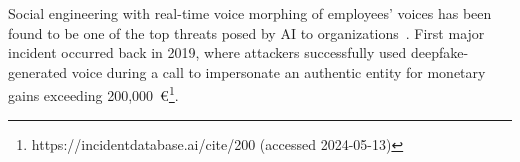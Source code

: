 
Social engineering with real-time voice morphing of employees' voices has been found to be one of the top threats posed by AI to organizations~\citep{mirsky_Threat_Offensive_AI_Organizations_2023}. First major incident occurred back in 2019, where attackers successfully used deepfake-generated voice during a call to impersonate an authentic entity for monetary gains exceeding 200,000~€\footnote{https://incidentdatabase.ai/cite/200 (accessed 2024-05-13)}.











